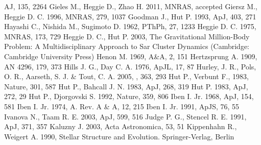 \begin{thebibliography}{99}
  AJ, 135, 2264
 Gieles M., Heggie D., Zhao H. 2011, MNRAS, accepted
  Giersz M., Heggie D. C. 1996, MNRAS, 279, 1037
  Goodman J., Hut P. 1993, ApJ, 403, 271
 Hayashi C., Nishida M., Sugimoto
  D. 1962, PThPh, 27, 1233
 Heggie
  D. C. 1975, MNRAS, 173, 729
  Heggie D. C., Hut P. 2003, The Gravitational Million-Body Problem:
  A Multidisciplinary Approach to Sar Cluster Dynamics (Cambridge:
  Cambridge University Press)
 Henon M. 1969,
  A\&A, 2, 151
  Hertzsprung A. 1909, AN 4296, 179, 373
 Hills
  J. G., Day C. A. 1976, ApJL, 17, 87
  Hurley, J. R., Pols, O. R., Aarseth, S. J. \& Tout, C. A. 2005,
  \mnras, 363, 293 
 Hut
  P., Verbunt F., 1983, Nature, 301, 587
 Hut
  P., Bahcall J. N. 1983, ApJ, 268, 319
 Hut P. 1983, ApJ,
  272, 29
 Hut
  P., Djorgovski S. 1992, Nature, 359, 806
 Iben
  I. Jr. 1968, ApJ, 154, 581
 Iben
  I. Jr. 1974, A. Rev. A \& A, 12, 215
 Iben
  I. Jr. 1991, ApJS, 76, 55
  Ivanova N., Taam R. E. 2003, ApJ, 599, 516
  Judge P. G., Stencel R. E. 1991, ApJ, 371, 357
 Kaluzny
  J. 2003, Acta Astronomica, 53, 51
  Kippenhahn R., Weigert A. 1990,
  Stellar Structure and Evolution. Springer-Verlag, Berlin

\end{thebibliography}
